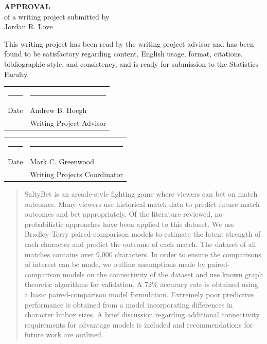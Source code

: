 \documentclass[12pt]{article}\usepackage[]{graphicx}\usepackage[]{color}\usepackage[]{subcaption}
\begin{document}
\begin{titlepage}
\null
\vspace{.5in}
\begin{center}
{\bf\huge APPROVAL}\\[1.in]
of a writing project submitted by\\[.25in]
Jordan R. Love \\[1.in]
\end{center}
\noindent
This writing project has been read by the writing project advisor and
has been found to be satisfactory regarding content, English usage,
format, citations, bibliographic style, and consistency, and is ready
for submission to the Statistics Faculty.

\vspace{.3in}
\begin{center}
\begin{tabular}{ll}
\rule{2.75in}{.03in} & \rule{2.75in}{.03in} \\
Date& Andrew B. Hoegh \\
& Writing Project Advisor \\
\end{tabular}
\end{center}

\vspace{1cm}

\begin{center}
\begin{tabular}{ll}
\rule{2.75in}{.03in} & \rule{2.75in}{.03in} \\
Date& Mark C. Greenwood \\
& Writing Projects Coordinator \\
\end{tabular}
\end{center}

\end{titlepage}

\newpage
\tableofcontents
\newpage

\begin{abstract}

SaltyBet is an arcade-style fighting game where viewers can bet on match outcomes. Many viewers use historical match data to predict future match outcomes and bet appropriately. Of the literature reviewed, no probabilistic approaches have been applied to this dataset. We use Bradley-Terry paired-comparison models to estimate the latent strength of each character and predict the outcome of each match. The dataset of all matches contains over 9,000 characters. In order to ensure the comparisons of interest can be made, we outline assumptions made by paired-comparison models on the connectivity of the dataset and use known graph theoretic algorithms for validation. A 72\% accuracy rate is obtained using a basic paired-comparison model formulation. Extremely poor predictive performance is obtained from a model incorporating differences in character hitbox sizes. A brief discussion regarding additional connectivity requirements for advantage models is included and recommendations for future work are outlined.


\end{abstract}
\end{document}
